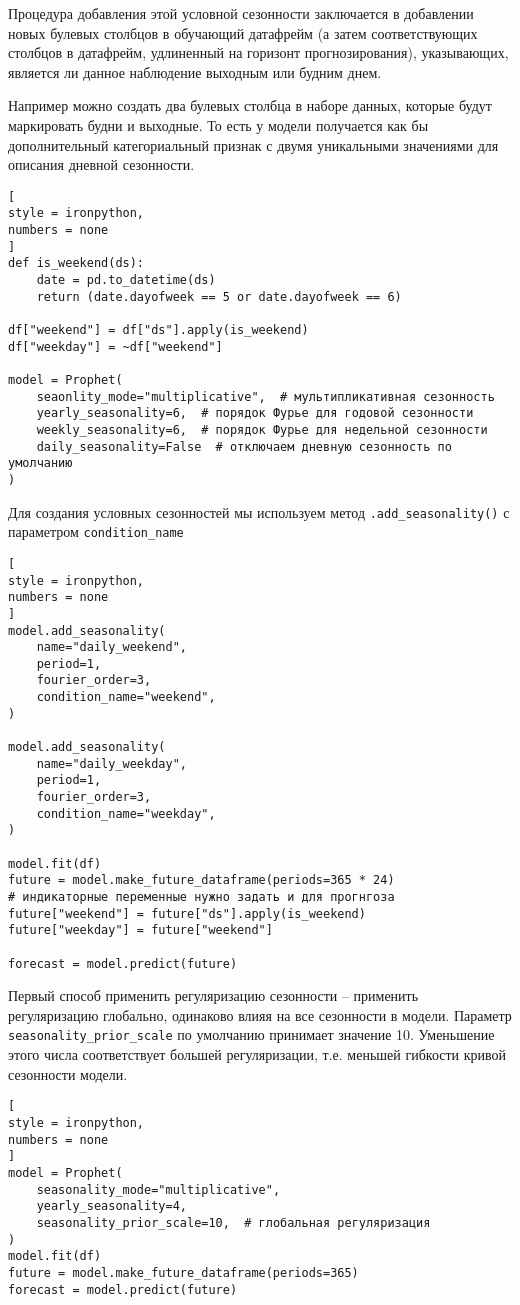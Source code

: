 \documentclass[%
	11pt,
	a4paper,
	utf8,
		]{article}
\begin{document}
Процедура добавления этой условной сезонности заключается в добавлении новых булевых столбцов в обучающий датафрейм (а затем соответствующих столбцов в датафрейм, удлиненный на горизонт прогнозирования), указывающих, является ли данное наблюдение выходным или будним днем.

Например можно создать два булевых столбца в наборе данных, которые будут маркировать будни и выходные. То есть у модели получается как бы дополнительный категориальный признак с двумя уникальными значениями для описания дневной сезонности.

\begin{lstlisting}[
style = ironpython,
numbers = none
]
def is_weekend(ds):
    date = pd.to_datetime(ds)
    return (date.dayofweek == 5 or date.dayofweek == 6)
    
df["weekend"] = df["ds"].apply(is_weekend)
df["weekday"] = ~df["weekend"]

model = Prophet(
    seaonlity_mode="multiplicative",  # мультипликативная сезонность
    yearly_seasonality=6,  # порядок Фурье для годовой сезонности
    weekly_seasonality=6,  # порядок Фурье для недельной сезонности
    daily_seasonality=False  # отключаем дневную сезонность по умолчанию
)
\end{lstlisting}

Для создания условных сезонностей мы используем метод \verb|.add_seasonality()| с параметром \verb|condition_name|
\begin{lstlisting}[
style = ironpython,
numbers = none
]
model.add_seasonality(
    name="daily_weekend",
    period=1,
    fourier_order=3,
    condition_name="weekend",
)

model.add_seasonality(
    name="daily_weekday",
    period=1,
    fourier_order=3,
    condition_name="weekday",
)

model.fit(df)
future = model.make_future_dataframe(periods=365 * 24)
# индикаторные переменные нужно задать и для прогнгоза
future["weekend"] = future["ds"].apply(is_weekend)
future["weekday"] = future["weekend"]

forecast = model.predict(future)
\end{lstlisting}

Первый способ применить регуляризацию сезонности -- применить регуляризацию глобально, одинаково влияя на все сезонности в модели. Параметр \verb|seasonality_prior_scale| по умолчанию принимает значение 10. Уменьшение этого числа соответствует большей регуляризации, т.е. меньшей гибкости кривой сезонности модели.
\begin{lstlisting}[
style = ironpython,
numbers = none
]
model = Prophet(
    seasonality_mode="multiplicative",
    yearly_seasonality=4,
    seasonality_prior_scale=10,  # глобальная регуляризация
)
model.fit(df)
future = model.make_future_dataframe(periods=365)
forecast = model.predict(future)
\end{lstlisting}
\end{document}
